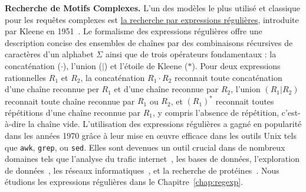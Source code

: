 \noindent\textbf{Recherche de Motifs Complexes.}
L'un des modèles le plus utilisé et classique pour les requêtes complexes est \underline{la recherche par expressions régulières}, introduite par Kleene en 1951~\cite{RM-704}.
Le formalisme des expressions régulières offre une description concise des ensembles de chaînes par des combinaisons récursives de caractères d'un alphabet $\Sigma$ ainsi que de trois opérateurs fondamentaux : la concaténation ($\cdot$), l'union ($|$) et l'étoile de Kleene ($\ast$).
Pour deux expressions rationnelles $R_1$ et $R_2$, la concaténation $R_1\cdot R_2$ reconnait toute concaténation d'une chaîne reconnue per $R_1$ et d'une chaîne reconnue par $R_2$, l'union $(R_1|R_2)$ reconnait toute chaîne reconnue par $R_1$ ou $R_2$, et $(R_1)^\ast$ reconnait toutes répétitions d'une chaîne reconnue par $R_1$, y compris l'absence de répétition, c'est-à-dire la chaîne vide.
L'utilisation des expressions régulières a gagné en popularité dans les années 1970 grâce à leur mise en œuvre efficace dans les outils Unix tels que \texttt{awk}, \texttt{grep}, ou \texttt{sed}.
Elles sont devenues un outil crucial dans de nombreux domaines tels que l'analyse du trafic internet~\cite{4221791,4579527}, les bases de données, l'exploration de données~\cite{1000341,10.5555/645927.672035,10.1145/375551.375569}, les réseaux informatiques~\cite{10.1145/1159913.1159952}, et la recherche de protéines~\cite{10.1145/369133.369220}.
%
Nous étudions les expressions régulières dans le Chapitre~\ref*{chap:regexp}.

